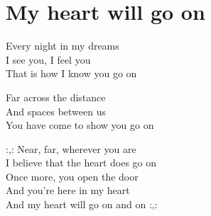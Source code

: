\section{My heart will go on}

Every night in my dreams\\
I see you, I feel you\\
That is how I know you go on

Far across the distance\\
And spaces between us\\
You have come to show you go on

:,: Near, far, wherever you are\\
I believe that the heart does go on\\
Once more, you open the door\\
And you're here in my heart\\
And my heart will go on and on :,:
